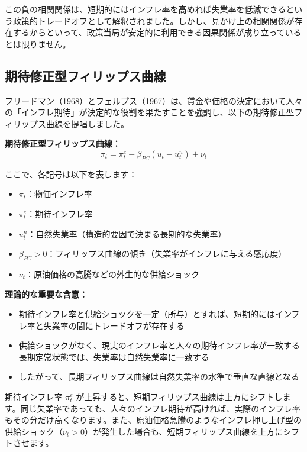\documentclass[
  japanese,
  lualatex,
  ja=standard,
  12pt,
  a4paper]{ltjsarticle}
\providecommand{\tightlist}{%
  \setlength{\itemsep}{0pt}\setlength{\parskip}{0pt}}
\begin{document}
この負の相関関係は、短期的にはインフレ率を高めれば失業率を低減できるという政策的トレードオフとして解釈されました。しかし、見かけ上の相関関係が存在するからといって、政策当局が安定的に利用できる因果関係が成り立っているとは限りません。

\subsection{期待修正型フィリップス曲線}\label{ux671fux5f85ux4feeux6b63ux578bux30d5ux30a3ux30eaux30c3ux30d7ux30b9ux66f2ux7dda}

フリードマン（1968）とフェルプス（1967）は、賃金や価格の決定において人々の「インフレ期待」が決定的な役割を果たすことを強調し、以下の期待修正型フィリップス曲線を提唱しました。


\textbf{期待修正型フィリップス曲線：} \[
\pi_t = \pi_t^e - \beta_{PC}(u_t - u_t^n)+\nu_t
\]

ここで、各記号は以下を表します：

\begin{itemize}
\tightlist
\item
  \(\pi_t\)：物価インフレ率
\item
  \(\pi_t^e\)：期待インフレ率
\item
  \(u_t^n\)：自然失業率（構造的要因で決まる長期的な失業率）
\item
  \(\beta_{PC} > 0\)：フィリップス曲線の傾き（失業率がインフレに与える感応度）
\item
  \(\nu_t\)：原油価格の高騰などの外生的な供給ショック
\end{itemize}


\textbf{理論的な重要な含意：}

\begin{itemize}
\tightlist
\item
  期待インフレ率と供給ショックを一定（所与）とすれば、短期的にはインフレ率と失業率の間にトレードオフが存在する
\item
  供給ショックがなく、現実のインフレ率と人々の期待インフレ率が一致する長期定常状態では、失業率は自然失業率に一致する
\item
  したがって、長期フィリップス曲線は自然失業率の水準で垂直な直線となる
\end{itemize}

期待インフレ率 \(\pi_t^e\)
が上昇すると、短期フィリップス曲線は上方にシフトします。同じ失業率であっても、人々のインフレ期待が高ければ、実際のインフレ率もその分だけ高くなります。また、原油価格急騰のようなインフレ押し上げ型の供給ショック（\(\nu_t>0\)）が発生した場合も、短期フィリップス曲線を上方にシフトさせます。
\end{document}
